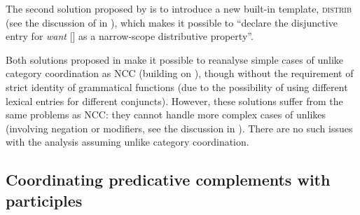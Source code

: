 \documentclass[output=paper]{../langscibook}
\begin{document}
The second solution proposed by \citet[138, fn. 9]{kapl:17} is to
introduce a new built-in template, \textsc{distrib} (see the discussion of
 in ), which makes it possible to
``declare the disjunctive entry for \emph{want} []
as a narrow-scope distributive property''.

Both solutions proposed in \citet{kapl:17} make it possible to
reanalyse simple cases of unlike category coordination as NCC
(building on \citet{max:man:96}), though without the requirement of strict
identity of grammatical functions (due to the possibility of using
different lexical entries for different conjuncts).
However, these
solutions suffer from the same problems as NCC: they
cannot handle more complex cases of unlikes (involving negation or
modifiers, see the discussion in ). There are
no such issues with the analysis assuming unlike category coordination.

\subsection{Coordinating predicative complements with participles}
\label{sec:Coordination:unlikes:pred:aux}
\end{document}
